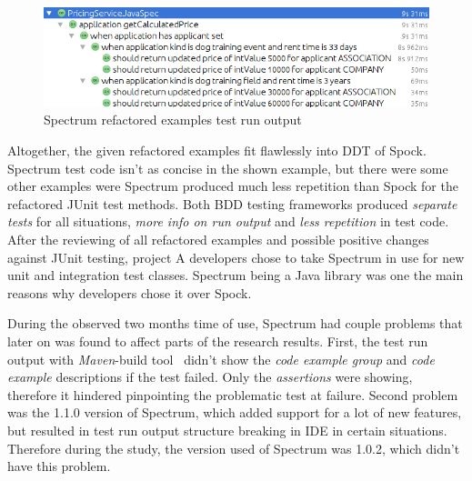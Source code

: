     \begin{figure}[H]
      \begin{center}
        \begin{topbot}[style=mdstyle]
        \includegraphics[width=\textwidth]{images/spectrum-pricing-results.png}
        \end{topbot}
        \caption{Spectrum refactored examples test run output}
        \label{fig:spectrum-allu-refactor-output}
      \end{center}
    \end{figure}

    Altogether, the given refactored examples fit flawlessly into DDT of Spock. Spectrum test code isn't as concise in the shown example,
    but there were some other examples were Spectrum produced much less repetition than Spock for the refactored JUnit test methods.
    Both BDD testing frameworks produced \textit{separate tests} for all situations, \textit{more info on run output} and \textit{less repetition} in test code.
    After the reviewing of all refactored examples and possible positive changes against JUnit testing, project A developers chose to take
    Spectrum in use for new unit and integration test classes. Spectrum being a Java library was one the main reasons
    why developers chose it over Spock.

    During the observed two months time of use, Spectrum had couple problems that later on was found to affect parts of the research
    results. First, the test run output with \textit{Maven}-build tool~\cite{maven} didn't show the \textit{code example group} and \textit{code example}
    descriptions if the test failed. Only the \textit{assertions} were showing, therefore it hindered pinpointing the problematic test at failure.
    Second problem was the 1.1.0 version of Spectrum, which added support for a lot of new features, but resulted in test
    run output structure breaking in IDE in certain situations. Therefore during the study, the version used of Spectrum was 1.0.2,
    which didn't have this problem.

    \clearpage

